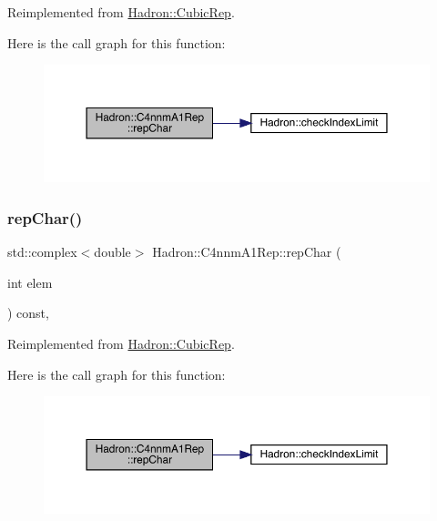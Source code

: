 Reimplemented from \mbox{\hyperlink{structHadron_1_1CubicRep_af45227106e8e715e84b0af69cd3b36f8}{Hadron\+::\+Cubic\+Rep}}.

Here is the call graph for this function\+:
\nopagebreak
\begin{figure}[H]
\begin{center}
\leavevmode
\includegraphics[width=350pt]{d4/dbc/structHadron_1_1C4nnmA1Rep_a369d43e2f70764875daf2967ab976dad_cgraph}
\end{center}
\end{figure}
\mbox{\label{structHadron_1_1C4nnmA1Rep_a369d43e2f70764875daf2967ab976dad}} 
\subsubsection{\texorpdfstring{repChar()}{repChar()}\hspace{0.1cm}{\footnotesize\ttfamily [2/2]}}
{\footnotesize\ttfamily std\+::complex$<$double$>$ Hadron\+::\+C4nnm\+A1\+Rep\+::rep\+Char (\begin{DoxyParamCaption}\item[{int}]{elem }\end{DoxyParamCaption}) const\hspace{0.3cm}{\ttfamily [inline]}, {\ttfamily [virtual]}}



Reimplemented from \mbox{\hyperlink{structHadron_1_1CubicRep_af45227106e8e715e84b0af69cd3b36f8}{Hadron\+::\+Cubic\+Rep}}.

Here is the call graph for this function\+:
\nopagebreak
\begin{figure}[H]
\begin{center}
\leavevmode
\includegraphics[width=350pt]{d4/dbc/structHadron_1_1C4nnmA1Rep_a369d43e2f70764875daf2967ab976dad_cgraph}
\end{center}
\end{figure}
\mbox{\label{structHadron_1_1C4nnmA1Rep_afd420b29cea68de99ec5e175a42bafc7}} 
